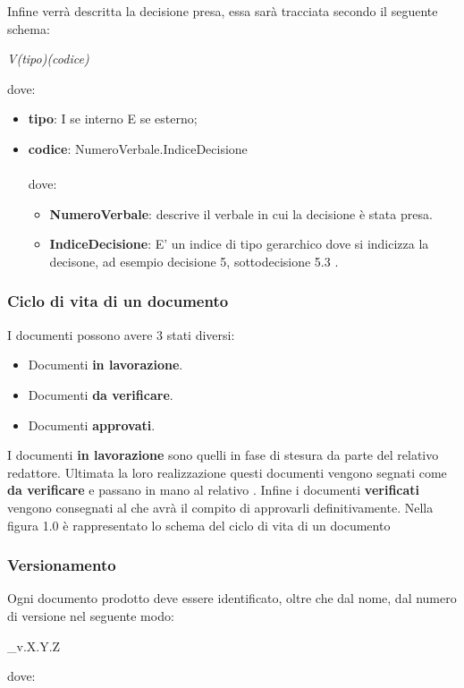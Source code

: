 Infine verrà descritta la decisione presa, essa sarà tracciata secondo il seguente schema: 
\begin{center}
\textit{V(tipo)(codice)}
\end{center}
dove:
\begin{itemize}
\item \textbf{tipo}: I se interno E se esterno;
\item \textbf{codice}: NumeroVerbale.IndiceDecisione \\ \\ dove:
\begin{itemize}
\item \textbf{NumeroVerbale}: descrive il verbale in cui la decisione è stata presa.
\item \textbf{IndiceDecisione}: E' un indice di tipo gerarchico dove si indicizza la decisone, ad esempio decisione 5, sottodecisione 5.3 .
\end{itemize}
\end{itemize}

\subsubsection{Ciclo di vita di un documento}
 I documenti possono avere 3 stati diversi:
\begin{itemize}
  \item Documenti \textbf{in lavorazione}.
  \item Documenti \textbf{da verificare}.
  \item Documenti \textbf{approvati}.
\end{itemize}
I documenti \textbf{in lavorazione} sono quelli in fase di stesura da parte del relativo redattore. Ultimata la loro realizzazione questi documenti vengono segnati come \textbf{da verificare} e passano in mano al relativo \Ver. Infine i documenti \textbf{verificati} vengono consegnati al \Pm che avrà il compito di approvarli definitivamente. Nella figura 1.0 è rappresentato lo schema del ciclo di vita di un documento

\subsubsection{Versionamento}
Ogni documento prodotto deve essere identificato, oltre che dal nome, dal numero
di versione nel seguente modo:
\begin{center}
  \_v.X.Y.Z
\end{center}
dove:

